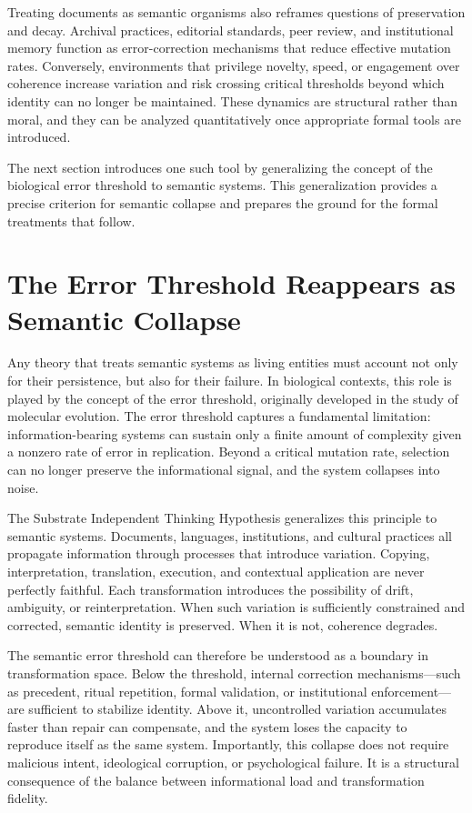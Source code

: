 \documentclass[11pt,oneside]{article}
\begin{document}
Treating documents as semantic organisms also reframes questions of preservation and decay. Archival practices, editorial standards, peer review, and institutional memory function as error-correction mechanisms that reduce effective mutation rates. Conversely, environments that privilege novelty, speed, or engagement over coherence increase variation and risk crossing critical thresholds beyond which identity can no longer be maintained. These dynamics are structural rather than moral, and they can be analyzed quantitatively once appropriate formal tools are introduced.

The next section introduces one such tool by generalizing the concept of the biological error threshold to semantic systems. This generalization provides a precise criterion for semantic collapse and prepares the ground for the formal treatments that follow.

\section{The Error Threshold Reappears as Semantic Collapse}

Any theory that treats semantic systems as living entities must account not only for their persistence, but also for their failure. In biological contexts, this role is played by the concept of the error threshold, originally developed in the study of molecular evolution. The error threshold captures a fundamental limitation: information-bearing systems can sustain only a finite amount of complexity given a nonzero rate of error in replication. Beyond a critical mutation rate, selection can no longer preserve the informational signal, and the system collapses into noise.

The Substrate Independent Thinking Hypothesis generalizes this principle to semantic systems. Documents, languages, institutions, and cultural practices all propagate information through processes that introduce variation. Copying, interpretation, translation, execution, and contextual application are never perfectly faithful. Each transformation introduces the possibility of drift, ambiguity, or reinterpretation. When such variation is sufficiently constrained and corrected, semantic identity is preserved. When it is not, coherence degrades.

The semantic error threshold can therefore be understood as a boundary in transformation space. Below the threshold, internal correction mechanisms—such as precedent, ritual repetition, formal validation, or institutional enforcement—are sufficient to stabilize identity. Above it, uncontrolled variation accumulates faster than repair can compensate, and the system loses the capacity to reproduce itself as the same system. Importantly, this collapse does not require malicious intent, ideological corruption, or psychological failure. It is a structural consequence of the balance between informational load and transformation fidelity.
\end{document}
